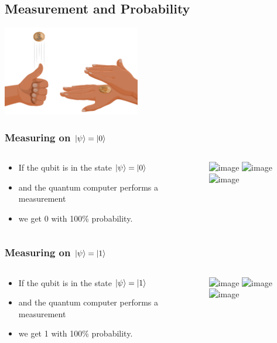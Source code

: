 \documentclass[10pt]{beamer}
\begin{document}
\begin{frame}
  \section{Measurement and Probability}

  \centering
  \includegraphics[width=6cm]{img/coin-flip.png}
\end{frame}
\begin{frame}
  \frametitle{Measuring on $\ket{\psi}=\ket{0}$}
  \begin{columns}
    \begin{column}{0.4\linewidth}
      \begin{itemize}
      \item<1-|alert@1> If the qubit is in the state $\ket{\psi}=\ket{0}$
      \item<2-|alert@2> and the quantum computer performs a measurement
      \item<3-|alert@3> we get 0 with 100\% probability.
      \end{itemize}
    \end{column}
    \begin{column}{0.5\linewidth}
      \includegraphics<1>[width=\linewidth]{img/euro-0.jpg}
      \includegraphics<2>[width=\linewidth]{img/coin-measure.png}
      \includegraphics<3>[width=\linewidth]{img/euro-0.jpg}
    \end{column}
  \end{columns}
\end{frame}

\begin{frame}
  \frametitle{Measuring on $\ket{\psi}=\ket{1}$}
  \begin{columns}
    \begin{column}{0.4\linewidth}
      \begin{itemize}
      \item<1-|alert@1> If the qubit is in the state $\ket{\psi}=\ket{1}$
      \item<2-|alert@2> and the quantum computer performs a measurement
      \item<3-|alert@3> we get 1 with 100\% probability.
      \end{itemize}
    \end{column}
    \begin{column}{0.5\linewidth}
      \includegraphics<1>[width=\linewidth]{img/euro-1.jpg}
      \includegraphics<2>[width=\linewidth]{img/coin-measure.png}
      \includegraphics<3>[width=\linewidth]{img/euro-1.jpg}
    \end{column}
  \end{columns}
\end{frame}
\end{document}

